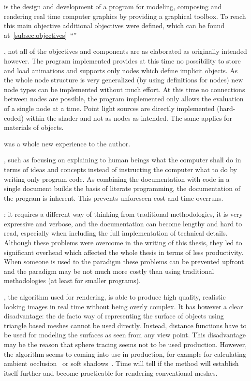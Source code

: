 \documentclass[%
    a4paper,    %
    justified,  %
    nobib,      %
    openany     %
]{tufte-book}
\begin{document}
 is the design and development of
a program for modeling, composing and rendering real time computer graphics by
providing a graphical toolbox. To reach this main objective additional
objectives were defined, which can be found
at~\autoref{subsec:objectives}~\enquote{}

, not all of the objectives
and components are as elaborated as originally intended however. The program
implemented provides at this time no possibility to store and load animations
and supports only nodes which define implicit objects. As the whole node
structure is very generalized (by using definitions for nodes) new node types
can be implemented without much effort. At this time no connections between
nodes are possible, the program implemented only allows the evaluation of a
single node at a time. Point light sources are directly implemented (hard-coded)
within the shader and not as nodes as intended. The same applies for materials
of objects.

 was a whole new
experience to the author.

, such as focusing on
explaining to human beings what the computer shall do in terms of ideas and
concepts instead of instructing the computer what to do by writing only program
code. As combining the documentation with code in a single document builds the
basis of literate programming, the documentation of the program is inherent.
This prevents unforeseen cost and time overruns.

: it
requires a different way of thinking from traditional methodologies, it is very
expressive and verbose, and the documentation can become lengthy and hard to
read, especially when including the full implementation of technical details.
Although these problems were overcome in the writing of this thesis, they led to
significant overhead which affected the whole thesis in terms of less
productivity. When someone is used to the paradigm these problems can be
prevented upfront and the paradigm may be not much more costly than using
traditional methodologies (at least for smaller programs).

, the algorithm used for rendering, is able to
produce high quality, realistic looking images in real time without being overly
complex. It has however a clear disadvantage: the de facto way of representing
the surface of objects using triangle based meshes cannot be used directly.
Instead, distance functions have to be used for modeling the surfaces as seen
from any view point. This disadvantage may be the reason that sphere tracing
seems not to be used production. However, the algorithm seems to coming into use
in production, for example for calculating ambient
occlusion~\cite{epic-games-ao-2017} or soft
shadows~\cite{epic-games-soft-shadows-2017}. Time will tell if the method will
establish itself further and become practicable for rendering conventional
meshes.
\end{document}
